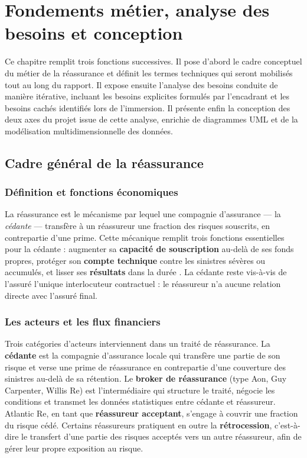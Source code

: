 \documentclass[../main.tex]{subfiles}
\begin{document}
\chapter{Fondements métier, analyse des besoins et conception}
\label{chap:metier}

Ce chapitre remplit trois fonctions successives. Il pose d'abord le cadre conceptuel
du métier de la réassurance et définit les termes techniques qui seront mobilisés
tout au long du rapport. Il expose ensuite l'analyse des besoins conduite de manière
itérative, incluant les besoins explicites formulés par l'encadrant et les besoins
cachés identifiés lors de l'immersion. Il présente enfin la conception des deux axes
du projet issue de cette analyse, enrichie de diagrammes UML et de la modélisation multidimensionnelle des données.

\section{Cadre général de la réassurance}

\subsection{Définition et fonctions économiques}

La réassurance est le mécanisme par lequel une compagnie d'assurance --- la
\textit{cédante} --- transfère à un réassureur une fraction des risques souscrits,
en contrepartie d'une prime. Cette mécanique remplit trois fonctions essentielles
pour la cédante : augmenter sa \textbf{capacité de souscription} au-delà de ses
fonds propres, protéger son \textbf{compte technique} contre les sinistres sévères
ou accumulés, et lisser ses \textbf{résultats} dans la durée \citep{Outreville2013}.
La cédante reste vis-à-vis de l'assuré l'unique interlocuteur contractuel : le
réassureur n'a aucune relation directe avec l'assuré final.

\subsection{Les acteurs et les flux financiers}

Trois catégories d'acteurs interviennent dans un traité de réassurance. La
\textbf{cédante} est la compagnie d'assurance locale qui transfère une partie de
son risque et verse une prime de réassurance en contrepartie d'une couverture des
sinistres au-delà de sa rétention. Le \textbf{broker de réassurance} (type Aon,
Guy Carpenter, Willis Re) est l'intermédiaire qui structure le traité, négocie les
conditions et transmet les données statistiques entre cédante et réassureur. Atlantic
Re, en tant que \textbf{réassureur acceptant}, s'engage à couvrir une fraction du
risque cédé. Certains réassureurs pratiquent en outre la \textbf{rétrocession},
c'est-à-dire le transfert d'une partie des risques acceptés vers un autre réassureur,
afin de gérer leur propre exposition au risque.
\end{document}
